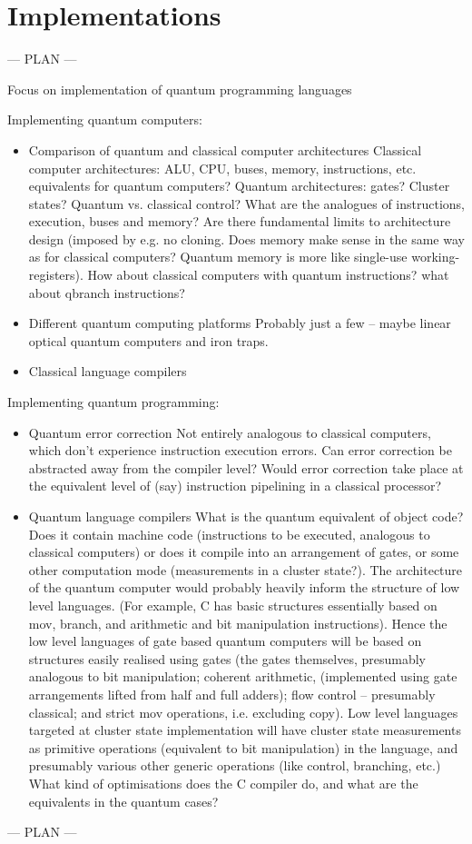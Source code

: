 \section{Implementations}

--- PLAN ---

Focus on implementation of quantum programming languages

Implementing quantum computers:
\begin{itemize}
\item Comparison of quantum and classical computer architectures
Classical computer architectures: ALU, CPU, buses, memory, instructions, etc. equivalents for quantum computers? Quantum architectures: gates? Cluster states? Quantum vs. classical control? What are the analogues of instructions, execution, buses and memory? Are there fundamental limits to architecture design (imposed by e.g. no cloning. Does memory make sense in the same way as for classical computers? Quantum memory is more like single-use working-registers). How about classical computers with quantum instructions? what about qbranch instructions?   
\item Different quantum computing platforms 
Probably just a few -- maybe linear optical quantum computers and iron traps. 
\item Classical language compilers
\end{itemize}
Implementing quantum programming:
\begin{itemize}
\item Quantum error correction
Not entirely analogous to classical computers, which don't experience instruction execution errors. Can error correction be abstracted away from the compiler level? Would error correction take place at the equivalent level of (say) instruction pipelining in a classical processor?    
\item Quantum language compilers
What is the quantum equivalent of object code? Does it contain machine code (instructions to be executed, analogous to classical computers) or does it compile into an arrangement of gates, or some other computation mode (measurements in a cluster state?). The architecture of the quantum computer would probably heavily inform the structure of low level languages. (For example, C has basic structures essentially based on mov, branch, and arithmetic and bit manipulation instructions). Hence the low level languages of gate based quantum computers will be based on structures easily realised using gates (the gates themselves, presumably analogous to bit manipulation; coherent arithmetic, (implemented using gate arrangements lifted from half and full adders); flow control -- presumably classical; and strict mov operations, i.e. excluding copy). Low level languages targeted at cluster state implementation will have cluster state measurements as primitive operations (equivalent to bit manipulation) in the language, and presumably various other generic operations (like control, branching, etc.) What kind of optimisations does the C compiler do, and what are the equivalents in the quantum cases?
\end{itemize}
--- PLAN ---

